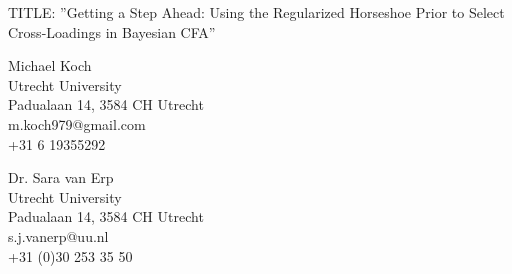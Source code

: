 \thispagestyle{empty}
\addtocounter{page}{-1}

\begin{center}
TITLE: ”Getting a Step Ahead: Using the Regularized Horseshoe
Prior to Select Cross-Loadings in Bayesian CFA”
\end{center}

\vspace{1cm}

Michael Koch \\
Utrecht University \\
Padualaan 14, 3584 CH Utrecht \\
m.koch979@gmail.com \\
+31 6 19355292

\vspace{1cm}

Dr. Sara van Erp \\
Utrecht University \\
Padualaan 14, 3584 CH Utrecht \\
s.j.vanerp@uu.nl \\
+31 (0)30 253 35 50

\clearpage
